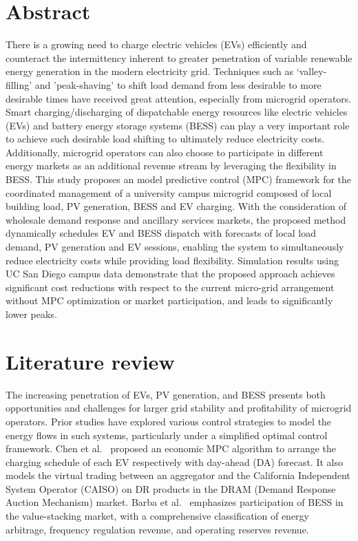 \documentclass[conference]{IEEEtran}
\begin{document}
\section{Abstract}
There is a growing need to charge electric vehicles (EVs) efficiently and counteract the intermittency inherent to greater penetration of variable renewable energy generation in the modern electricity grid. Techniques such as `valley-filling' and 'peak-shaving' to shift load demand from less desirable to more desirable times have received great attention, especially from microgrid operators. Smart charging/discharging of dispatchable energy resources like electric vehicles (EVs) and battery energy storage systems (BESS) can play a very important role to achieve such desirable load shifting to ultimately reduce electricity costs. Additionally, microgrid operators can also choose to participate in different energy markets as an additional revenue stream by leveraging the flexibility in BESS. This study proposes an model predictive control (MPC) framework for the coordinated management of a university campus microgrid composed of local building load, PV generation, BESS and EV charging. With the consideration of wholesale demand response and ancillary services markets, the proposed method dynamically schedules EV and BESS dispatch with forecasts of local load demand, PV generation and EV sessions, enabling the system to simultaneously reduce electricity costs while providing load flexibility. Simulation results using UC San Diego campus data demonstrate that the proposed approach achieves significant cost reductions with respect to the current micro-grid arrangement without MPC optimization or market participation, and leads to significantly lower peaks. 


\section{Literature review}
The increasing penetration of EVs, PV generation, and BESS presents both opportunities and challenges for larger grid stability and profitability of microgrid operators. Prior studies have explored various control strategies to model the energy flows in such systems, particularly under a simplified optimal control framework. Chen et al.~\cite{chen2024cost} proposed an economic MPC algorithm to arrange the charging schedule of each EV respectively with day-ahead (DA) forecast. It also models the virtual trading between an aggregator and the California Independent System Operator (CAISO) on DR products in the DRAM (Demand Response Auction Mechanism) market. Barba et al.~\cite{10761105} emphasizes participation of BESS in the value-stacking market, with a comprehensive classification of energy arbitrage, frequency regulation revenue, and operating reserves revenue. 
\end{document}
